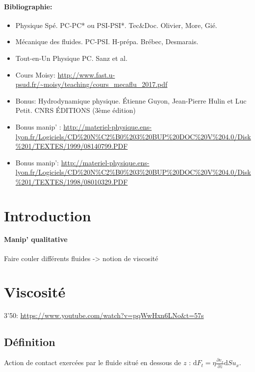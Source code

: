 \documentclass[11pt]{report}
\numberwithin{figure}{section}
\numberwithin{equation}{section}
\numberwithin{table}{section}
\newcommand{\ud}{\mathrm{d}}
\newcommand{\1}{\boldsymbol{1}}
\begin{document}
\paragraph*{Bibliographie:}
\begin{itemize}
\item Physique Spé. PC-PC* ou PSI-PSI*. Tec\&Doc. Olivier, More, Gié.
\item Mécanique des fluides. PC-PSI. H-prépa. Brébec, Desmarais.
\item Tout-en-Un Physique PC. Sanz et al.
\item Cours Moisy: \url{http://www.fast.u-psud.fr/~moisy/teaching/cours_mecaflu_2017.pdf}
\item Bonus: Hydrodynamique physique. \'Etienne Guyon, Jean-Pierre Hulin et Luc Petit.  CNRS ÉDITIONS (3ème édition) 
\item Bonus manip' : \url{http://materiel-physique.ens-lyon.fr/Logiciels/CD%20N%C2%B0%203%20BUP%20DOC%20V%204.0/Disk%201/TEXTES/1999/08140799.PDF}
\item Bonus manip': \url{http://materiel-physique.ens-lyon.fr/Logiciels/CD%20N%C2%B0%203%20BUP%20DOC%20V%204.0/Disk%201/TEXTES/1998/08010329.PDF}
\end{itemize}



\section*{Introduction}

\paragraph{Manip' qualitative} Faire couler différents fluides -> notion de viscosité

\section{Viscosité}

3'50: \url{https://www.youtube.com/watch?v=pqWwHxn6LNo&t=57s}

\subsection{Définition}

Action de contact exercées par le fluide situé en dessous de $z$ : $\ud F_t = \eta \frac{\partial v_x}{\partial z} \ud S u_x$.
\end{document}
